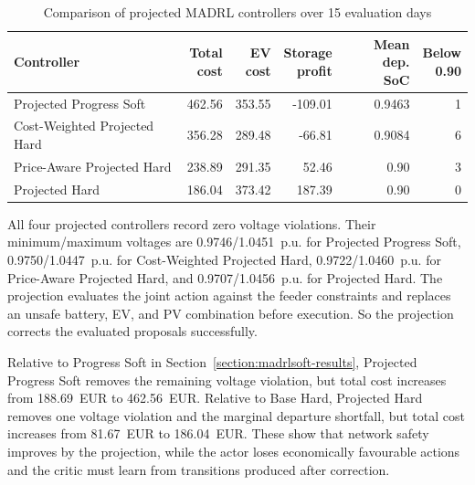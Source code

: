 \begin{table}[htbp]
  \centering
  \renewcommand{\arraystretch}{1.15}
  \caption{Comparison of projected MADRL controllers over 15 evaluation days}
  \label{tab:ch6-projection-ablation}
  \setlength{\tabcolsep}{4pt}
  \begin{tabular}{p{4.3cm}rrrrr}
    \hline
    Controller & \shortstack{Total\\cost} & \shortstack{EV\\cost} & \shortstack{Storage\\profit} & \shortstack{Mean dep.\\SoC} & \shortstack{Below\\0.90} \\
    \hline
    Projected Progress Soft & 462.56 & 353.55 & -109.01 & 0.9463 & 1 \\
    Cost-Weighted Projected Hard & 356.28 & 289.48 & -66.81 & 0.9084 & 6 \\
    Price-Aware Projected Hard & 238.89 & 291.35 & 52.46 & 0.90 & 3 \\
    Projected Hard & 186.04 & 373.42 & 187.39 & 0.90 & 0 \\
    \hline
  \end{tabular}
\end{table}

All four projected controllers record zero voltage violations. Their minimum/maximum voltages are 0.9746/1.0451~p.u. for Projected Progress Soft, 0.9750/1.0447~p.u. for Cost-Weighted Projected Hard, 0.9722/1.0460~p.u. for Price-Aware Projected Hard, and 0.9707/1.0456~p.u. for Projected Hard. The projection evaluates the joint action against the feeder constraints and replaces an unsafe battery, EV, and PV combination before execution. So the projection corrects the evaluated proposals successfully.

Relative to Progress Soft in Section~\ref{section:madrlsoft-results}, Projected Progress Soft removes the remaining voltage violation, but total cost increases from 188.69~EUR to 462.56~EUR. Relative to Base Hard, Projected Hard removes one voltage violation and the marginal departure shortfall, but total cost increases from 81.67~EUR to 186.04~EUR. These show that network safety improves by the projection, while the actor loses economically favourable actions and the critic must learn from transitions produced after correction.

